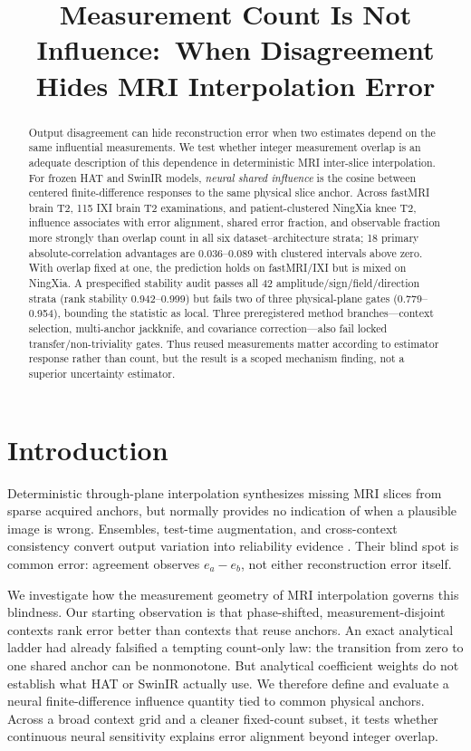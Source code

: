 \documentclass[10pt,twocolumn,letterpaper]{article}
\title{Measurement Count Is Not Influence:\
When Disagreement Hides MRI Interpolation Error}
\begin{document}
\maketitle

\begin{abstract}
Output disagreement can hide reconstruction error when two estimates depend on the same influential measurements. We test whether integer measurement overlap is an adequate description of this dependence in deterministic MRI inter-slice interpolation. For frozen HAT and SwinIR models, \emph{neural shared influence} is the cosine between centered finite-difference responses to the same physical slice anchor. Across fastMRI brain T2, 115 IXI brain T2 examinations, and patient-clustered NingXia knee T2, influence associates with error alignment, shared error fraction, and observable fraction more strongly than overlap count in all six dataset--architecture strata; 18 primary absolute-correlation advantages are 0.036--0.089 with clustered intervals above zero. With overlap fixed at one, the prediction holds on fastMRI/IXI but is mixed on NingXia. A prespecified stability audit passes all 42 amplitude/sign/field/direction strata (rank stability 0.942--0.999) but fails two of three physical-plane gates (0.779--0.954), bounding the statistic as local. Three preregistered method branches---context selection, multi-anchor jackknife, and covariance correction---also fail locked transfer/non-triviality gates. Thus reused measurements matter according to estimator response rather than count, but the result is a scoped mechanism finding, not a superior uncertainty estimator.
\end{abstract}

\section{Introduction}
Deterministic through-plane interpolation synthesizes missing MRI slices from sparse acquired anchors, but normally provides no indication of when a plausible image is wrong. Ensembles, test-time augmentation, and cross-context consistency convert output variation into reliability evidence \cite{lakshminarayanan2017ensembles,gal2016dropout,edupuganti2021uncertainty}. Their blind spot is common error: agreement observes $e_a-e_b$, not either reconstruction error itself.

We investigate how the measurement geometry of MRI interpolation governs this blindness. Our starting observation is that phase-shifted, measurement-disjoint contexts rank error better than contexts that reuse anchors. An exact analytical ladder had already falsified a tempting count-only law: the transition from zero to one shared anchor can be nonmonotone. But analytical coefficient weights do not establish what HAT or SwinIR actually use. We therefore define and evaluate a neural finite-difference influence quantity tied to common physical anchors. Across a broad context grid and a cleaner fixed-count subset, it tests whether continuous neural sensitivity explains error alignment beyond integer overlap.
\end{document}
